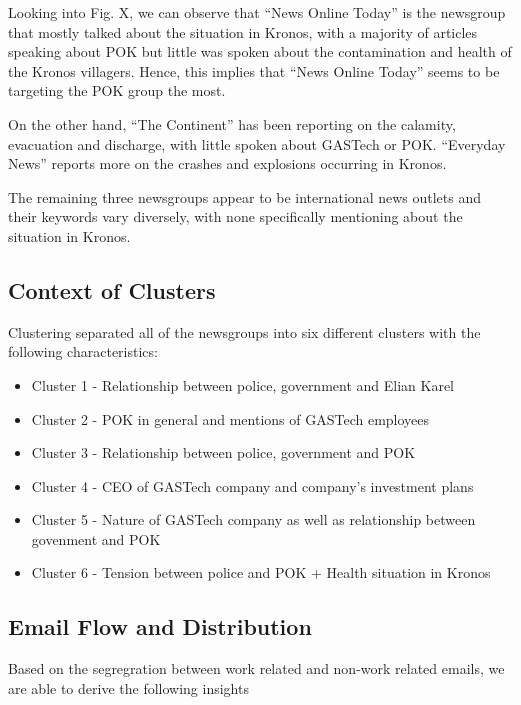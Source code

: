 \documentclass{acm_proc_article-sp}
\begin{document}
Looking into Fig. X, we can observe that ``News Online Today'' is the
newsgroup that mostly talked about the situation in Kronos, with a
majority of articles speaking about POK but little was spoken about the
contamination and health of the Kronos villagers. Hence, this implies
that ``News Online Today'' seems to be targeting the POK group the most.

On the other hand, ``The Continent'' has been reporting on the calamity,
evacuation and discharge, with little spoken about GASTech or POK.
``Everyday News'' reports more on the crashes and explosions occurring
in Kronos.

The remaining three newsgroups appear to be international news outlets
and their keywords vary diversely, with none specifically mentioning
about the situation in Kronos.

\hypertarget{context-of-clusters}{%
\subsection{Context of Clusters}\label{context-of-clusters}}

Clustering separated all of the newsgroups into six different clusters
with the following characteristics:

\begin{itemize}
\item
  Cluster 1 - Relationship between police, government and Elian Karel
\item
  Cluster 2 - POK in general and mentions of GASTech employees
\item
  Cluster 3 - Relationship between police, government and POK
\item
  Cluster 4 - CEO of GASTech company and company's investment plans
\item
  Cluster 5 - Nature of GASTech company as well as relationship between
  govenment and POK
\item
  Cluster 6 - Tension between police and POK + Health situation in
  Kronos
\end{itemize}

\hypertarget{email-flow-and-distribution}{%
\subsection{Email Flow and
Distribution}\label{email-flow-and-distribution}}

Based on the segregration between work related and non-work related
emails, we are able to derive the following insights
\end{document}
